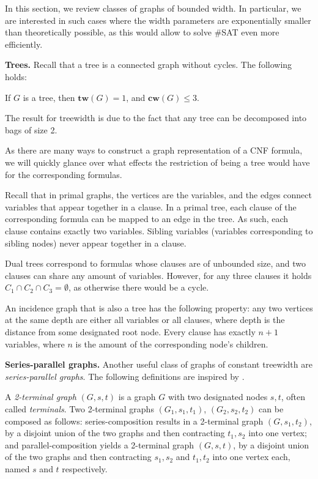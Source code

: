 In this section, we review classes of graphs of bounded width.
In particular, we are interested in such cases where the width parameters are exponentially smaller than theoretically possible, as this would allow to solve \#SAT even more efficiently.

\textbf{Trees.}
Recall that a tree is a connected graph without cycles.
The following holds:

\begin{fact}
	If $G$ is a tree, then $\mathbf{tw}(G) = 1$, and $\mathbf{cw}(G) \leq 3$. 
	\label{gw:tree}
\end{fact}

\noindent
The result for treewidth is due to the fact that any tree can be decomposed into bags of size 2.
{\color{lightgray} As there are many ways to construct a graph representation of a CNF formula, we will quickly glance over what effects the restriction of being a tree would have for the corresponding formulas.

Recall that in primal graphs, the vertices are the variables, and the edges connect variables that appear together in a clause.
In a primal tree, each clause of the corresponding formula can be mapped to an edge in the tree.
As such, each clause contains exactly two variables.
Sibling variables (variables corresponding to sibling nodes) never appear together in a clause.

Dual trees correspond to formulas whose clauses are of unbounded size, and two clauses can share any amount of variables. However, for any three clauses it holds $C_1 \cap C_2 \cap C_3 = \emptyset$, as otherwise there would be a cycle.

An incidence graph that is also a tree has the following property: any two vertices at the same depth are either all variables or all clauses, where depth is the distance from some designated root node.
Every clause has exactly $n+1$ variables, where $n$ is the amount of the corresponding node's children.}

\textbf{Series-parallel graphs.}
Another useful class of graphs of constant treewidth are {\em series-parallel graphs}. The following definitions are inspired by \cite{DBLP:journals/corr/abs-2004-00547}.

A {\em 2-terminal graph} $(G, s, t)$ is a graph $G$ with two designated nodes $s, t$, often called {\em terminals}.
Two 2-terminal graphs $(G_1, s_1, t_1)$, $(G_2, s_2, t_2)$ can be composed as follows:
series-composition results in a 2-terminal graph $(G, s_1, t_2)$, by a disjoint union of the two graphs and then contracting $t_1, s_2$ into one vertex;
and parallel-composition yields a 2-terminal graph $(G, s, t)$, by a disjoint union of the two graphs and then contracting $s_1, s_2$ and $t_1, t_2$ into one vertex each, named $s$ and $t$ respectively.

